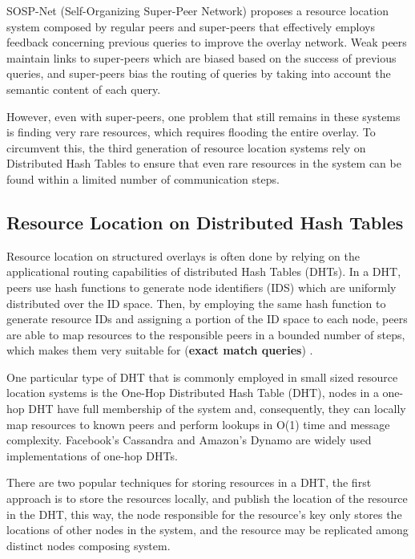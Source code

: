 SOSP-Net \cite{garbacki2007optimizing}  (Self-Organizing Super-Peer Network) proposes a resource location system composed by regular peers and super-peers that effectively employs feedback concerning previous queries to improve the overlay network. Weak peers maintain links to super-peers which are biased based on the success of previous queries, and super-peers bias the routing of queries by taking into account the semantic content of each query. 

However, even with super-peers, one problem that still remains in these systems is finding very rare resources, which requires flooding the entire overlay. To circumvent this, the third generation of resource location systems rely on Distributed Hash Tables to ensure that even rare resources in the system can be found within a limited number of communication steps.

\subsection{Resource Location on Distributed Hash Tables}

Resource location on structured overlays is often done by relying on the applicational routing capabilities of distributed Hash Tables (DHTs). In a DHT, peers use hash functions to generate node identifiers (IDS) which are uniformly distributed over the ID space. Then, by employing the same hash function to generate resource IDs and assigning a portion of the ID space to each node, peers are able to map resources to the responsible peers in a bounded number of steps, which makes them very suitable for (\textbf{exact match queries}) \cite{leitaoPHDthesis}. 

One particular type of DHT that is commonly employed in small sized resource location systems is the One-Hop Distributed Hash Table (DHT), nodes in a one-hop DHT have full membership of the system and, consequently, they can locally map resources to known peers and perform lookups in O(1) time and message complexity. Facebook's Cassandra \cite{lakshman2010cassandra} and Amazon's Dynamo \cite{decandia2007dynamo} are widely used implementations of one-hop DHTs. 

There are two popular techniques for storing resources in a DHT, the first approach is to store the resources locally, and publish the location of the resource in the DHT, this way, the node responsible for the resource's key only stores the locations of other nodes in the system, and the resource may be replicated among distinct nodes composing system. 

